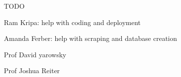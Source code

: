 
TODO

Ram Kripa: help with coding and deployment 

Amanda Ferber: help with scraping and database creation

Prof David yarowsky 

Prof Joshua Reiter 